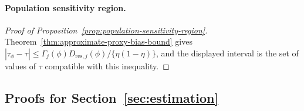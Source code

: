 \paragraph{Population sensitivity region.}
\begin{proof}[Proof of Proposition~\ref{prop:population-sensitivity-region}]
Theorem~\ref{thm:approximate-proxy-bias-bound} gives $|\tau_\phi-\tau|\le\Gamma_j(\phi)D_{\mathrm{res},j}(\phi)/\{\eta(1-\eta)\}$, and the displayed interval is the set of values of $\tau$ compatible with this inequality.
\end{proof}

\subsection{Proofs for Section~\ref{sec:estimation}}

